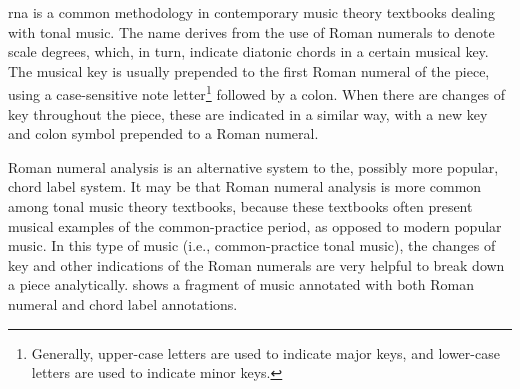 

\gls{rna} is a common methodology in
contemporary music theory textbooks dealing with tonal
music. The name derives from the use of Roman numerals to
denote scale degrees, which, in turn, indicate diatonic
chords in a certain musical key. The musical key is usually
prepended to the first Roman numeral of the piece, using a
case-sensitive note letter\footnote{Generally, upper-case
letters are used to indicate major keys, and lower-case
letters are used to indicate minor keys.} followed by a
colon. When there are changes of key throughout the piece,
these are indicated in a similar way, with a new key and
colon symbol prepended to a Roman numeral.

Roman numeral analysis is an alternative system to the,
possibly more popular, chord label system. It may be that
Roman numeral analysis is more common among tonal music
theory textbooks, because these textbooks often present
musical examples of the common-practice period, as opposed
to modern popular music. In this type of music (i.e.,
common-practice tonal music), the changes of key and other
indications of the Roman numerals are very helpful to break
down a piece analytically.  shows a fragment
of music annotated with both Roman numeral and chord label
annotations.

